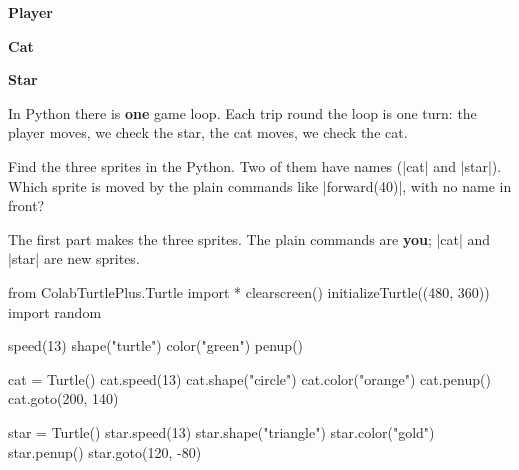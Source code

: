\begin{center}
\begin{minipage}[t]{0.32\linewidth}
\textbf{Player}\par
\begin{scratch}[scale=0.72]
\end{scratch}
\end{minipage}\hfill
\begin{minipage}[t]{0.32\linewidth}
\textbf{Cat}\par
\begin{scratch}[scale=0.72]
\end{scratch}
\end{minipage}\hfill
\begin{minipage}[t]{0.32\linewidth}
\textbf{Star}\par
\begin{scratch}[scale=0.72]
\end{scratch}
\end{minipage}
\end{center}

In Python there is \textbf{one} game loop. Each trip round the loop is one turn: the player moves, we check the star, the cat moves, we check the cat.

\begin{think}
Find the three sprites in the Python. Two of them have names (\py|cat| and \py|star|). Which sprite is moved by the plain commands like \py|forward(40)|, with no name in front?
\end{think}

The first part makes the three sprites. The plain commands are \textbf{you}; \py|cat| and \py|star| are new sprites.

\begin{typethis}
from ColabTurtlePlus.Turtle import *
clearscreen()
initializeTurtle((480, 360))
import random

speed(13)
shape("turtle")
color("green")
penup()

cat = Turtle()
cat.speed(13)
cat.shape("circle")
cat.color("orange")
cat.penup()
cat.goto(200, 140)

star = Turtle()
star.speed(13)
star.shape("triangle")
star.color("gold")
star.penup()
star.goto(120, -80)
\end{typethis}


